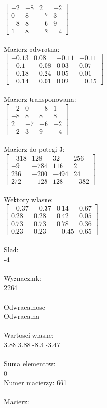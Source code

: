 \documentclass[a4paper,12pt]{article}
\begin{document}
$\begin{bmatrix} -2&-8&2&-2\\0&8&-7&3\\-8&8&-6&9\\1&8&-2&-4 \end{bmatrix}$
\\
\\
Macierz odwrotna:\\

$\begin{bmatrix} -0.13&0.08&-0.11&-0.11\\-0.1&-0.08&0.03&0.07\\-0.18&-0.24&0.05&0.01\\-0.14&-0.01&0.02&-0.15 \end{bmatrix}$
\\
\\
Macierz transponowana:\\

$\begin{bmatrix} -2&0&-8&1\\-8&8&8&8\\2&-7&-6&-2\\-2&3&9&-4 \end{bmatrix}$
\\
\\
Macierz do potegi 3:\\

$\begin{bmatrix} -318&128&32&256\\-9&-784&116&2\\236&-200&-494&24\\272&-128&128&-382 \end{bmatrix}$
\\
\\
Wektory wlasne:\\

$\begin{bmatrix} -0.37&-0.37&0.14&0.67\\0.28&0.28&0.42&0.05\\0.73&0.73&0.78&0.36\\0.23&0.23&-0.45&0.65 \end{bmatrix}$
\\
\\
Slad:\\
-4
\\
\\
Wyznacznik:\\
2264
\\
\\
Odwracalnosc:\\
Odwracalna
\\
\\
Wartosci wlasne:\\
3.88 3.88 -8.3 -3.47
\\
\\
Suma elementow:\\
0
\\
\newpage
Numer macierzy:
661
\\
\\
Macierz:\\
\end{document}
